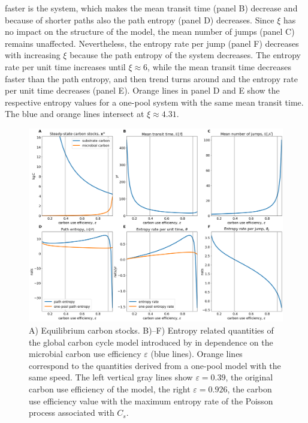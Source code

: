 \documentclass[smallextended]{svjour3}
\begin{document}
faster is the system, which makes the mean transit time (panel B) decrease and because of shorter paths also the path entropy (panel D) decreases.
Since $\xi$ has no impact on the structure of the model, the mean number of jumps (panel C) remains unaffected.
Nevertheless, the entropy rate per jump (panel F) decreases with increasing $\xi$ because the path entropy of the system decreases.
The entropy rate per unit time increases until $\xi\approx6$, while the mean transit time decreases faster than the path entropy, and then trend turns around and the entropy rate per unit time decreases (panel E).
Orange lines in panel D and E show the respective entropy values for a one-pool system with the same mean transit time.
The blue and orange lines intersect at $\xi\approx4.31$.

\begin{figure}[htbp]
    \centering
    \includegraphics[width=1.0\linewidth]{figs/Wang_entropies}
    \caption[Entropy related quantities of the model introduced by \citet{Wang2014BG}.]{
    A) Equilibrium carbon stocks. B)--F) Entropy related quantities of the global carbon cycle model introduced by \citet{Wang2014BG} in dependence on the microbial carbon use efficiency $\varepsilon$ (blue lines).
    Orange lines correspond to the quantities derived from a one-pool model with the same speed.
    The left vertical gray lines show $\varepsilon=0.39$, the original carbon use efficiency of the model, the right $\varepsilon=0.926$, the carbon use efficiency value with the maximum entropy rate of the Poisson process associated with $C_s$.}
    \label{fig:Wang_entropies}
\end{figure}
\end{document}

